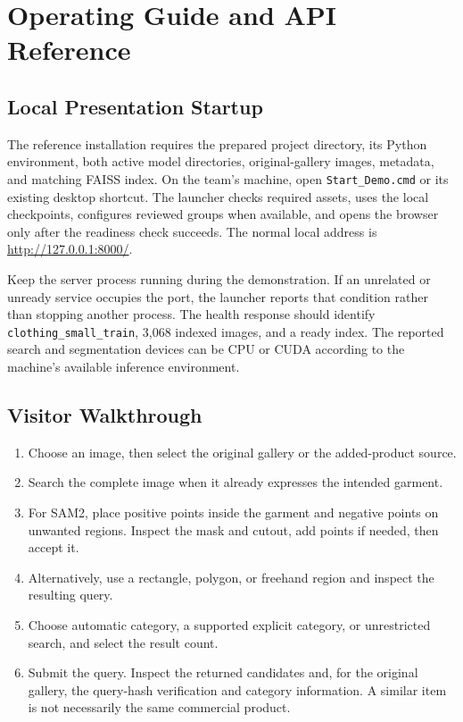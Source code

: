 \chapter{Operating Guide and API Reference}
\label{app:operations}

\section{Local Presentation Startup}
The reference installation requires the prepared project directory, its Python
environment, both active model directories, original-gallery images, metadata,
and matching FAISS index. On the team's machine, open \texttt{Start\_Demo.cmd}
or its existing desktop shortcut. The launcher checks required assets, uses
the local checkpoints, configures reviewed groups when available, and opens
the browser only after the readiness check succeeds. The normal local address
is \url{http://127.0.0.1:8000/}.

Keep the server process running during the demonstration. If an unrelated or
unready service occupies the port, the launcher reports that condition rather
than stopping another process. The health response should identify
\texttt{clothing\_small\_train}, 3,068 indexed images, and a ready index. The
reported search and segmentation devices can be CPU or CUDA according to the
machine's available inference environment.

\section{Visitor Walkthrough}
\begin{enumerate}[leftmargin=1.8em,itemsep=0.45em]
 \item Choose an image, then select the original gallery or the added-product source.
 \item Search the complete image when it already expresses the intended garment.
 \item For SAM2, place positive points inside the garment and negative points on
 unwanted regions. Inspect the mask and cutout, add points if needed, then accept it.
 \item Alternatively, use a rectangle, polygon, or freehand region and inspect
 the resulting query.
 \item Choose automatic category, a supported explicit category, or unrestricted
 search, and select the result count.
 \item Submit the query. Inspect the returned candidates and, for the original
 gallery, the query-hash verification and category information. A similar item
 is not necessarily the same commercial product.
\end{enumerate}

